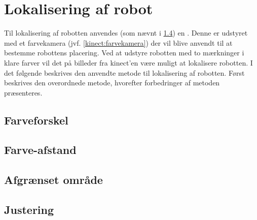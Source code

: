 \section{Lokalisering af robot}
Til lokalisering af robotten anvendes (som nævnt i \cref{}) en \kinect.
Denne er udstyret med et farvekamera (jvf. \cref{kinect:farvekamera}) der vil blive anvendt til at bestemme robottens placering.
Ved at udstyre robotten med to mærkninger i klare farver vil det på billeder fra kinect'en være muligt at lokalisere robotten.
I det følgende beskrives den anvendte metode til lokalisering af robotten.
Først beskrives den overordnede metode, hvorefter forbedringer af metoden præsenteres.

\subsection{Farveforskel}

\subsection{Farve-afstand}

\subsection{Afgrænset område}

\subsection{Justering}
